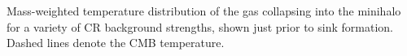 \label{fig:temp}
Mass-weighted temperature distribution of the gas collapsing into the minihalo for a variety of CR background strengths, shown just prior to sink formation.  Dashed lines denote the CMB temperature.